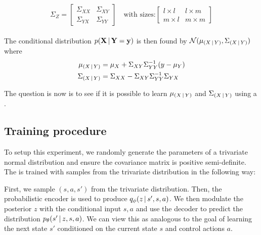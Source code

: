 \begin{equation}
\Sigma_{Z} = 
\begin{bmatrix}
\Sigma_{XX} & \Sigma_{XY} \\
\Sigma_{YX} & \Sigma_{YY}
\end{bmatrix}
\quad
\text{with sizes:} 
\begin{bmatrix}
l\times l & l \times m\\
m \times l & m \times m
\end{bmatrix}
\end{equation}
\\
The conditional distribution $p\given{\mathbf{X}}{\mathbf{Y}=\mathbf{y}}$ is then found by $\mathcal{N} (\mu_{\given{X}{Y}}, \Sigma_{\given{X}{Y}})$ where
\begin{align}
\mu_{\given{X}{Y}} &= \mu_{X} + \Sigma_{XY}\Sigma_{YY}^{-1}(y - \mu_{Y})
\label{eq_cond_mean}
\\
\Sigma_{\given{X}{Y}} &= \Sigma_{XX} - \Sigma_{XY}\Sigma_{YY}^{-1}\Sigma_{YX}
\label{eq_cond_var}
\end{align}

The question is now is to see if it is possible to learn $\mu_{\given{X}{Y}}$ and $\Sigma_{\given{X}{Y}}$ using a \cvae{}.


\subsection{Training procedure}

To setup this experiment, we randomly generate the parameters of a trivariate normal distribution and ensure the covariance matrix is positive semi-definite. The \cvae{} is trained with samples from the trivariate distribution in the following way:

First, we sample $(s, a, s')$ from the trivariate distribution. Then, the probabilistic encoder is used to produce $\qphi \given{z}{s', s, a}$. We then modulate the posterior $z$ with the conditional input $s, a$ and use the decoder to predict the distribution $\ptheta \given{s'}{z, s, a}$. We can view this as analogous to the goal of learning the next state $s'$ conditioned on the current state $s$ and control actions $a$.

